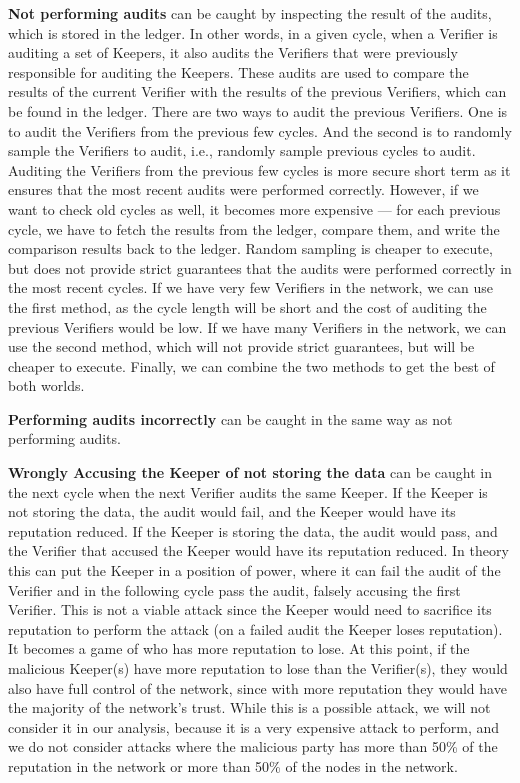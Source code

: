 \textbf{Not performing audits} can be caught by inspecting the result of the audits,
which is stored in the ledger.
In other words, in a given cycle, when a Verifier is auditing a set of Keepers,
it also audits the Verifiers that were previously responsible for auditing the Keepers.
These audits are used to compare the results of the current Verifier
with the results of the previous Verifiers, which can be found in the ledger.
There are two ways to audit the previous Verifiers.
One is to audit the Verifiers from the previous few cycles.
And the second is to randomly sample the Verifiers to audit,
i.e., randomly sample previous cycles to audit.
Auditing the Verifiers from the previous few cycles is more secure short term
as it ensures that the most recent audits were performed correctly.
However, if we want to check old cycles as well, it becomes more expensive ---
for each previous cycle, we have to fetch the results from the ledger, compare them,
and write the comparison results back to the ledger.
Random sampling is cheaper to execute, but does not provide strict guarantees
that the audits were performed correctly in the most recent cycles.
If we have very few Verifiers in the network, we can use the first method,
as the cycle length will be short and the cost of auditing the previous Verifiers would be low.
If we have many Verifiers in the network, we can use the second method,
which will not provide strict guarantees, but will be cheaper to execute.
Finally, we can combine the two methods to get the best of both worlds.

\textbf{Performing audits incorrectly} can be caught in the same way as not performing audits.

\textbf{Wrongly Accusing the Keeper of not storing the data} can be caught in the next cycle
when the next Verifier audits the same Keeper.
If the Keeper is not storing the data, the audit would fail, and the Keeper would have its reputation reduced.
If the Keeper is storing the data, the audit would pass, and the Verifier that accused the Keeper
would have its reputation reduced.
In theory this can put the Keeper in a position of power, where it can fail the audit of the Verifier
and in the following cycle pass the audit, falsely accusing the first Verifier.
This is not a viable attack since the Keeper would need to sacrifice its reputation to perform the attack
(on a failed audit the Keeper loses reputation).
It becomes a game of who has more reputation to lose.
At this point, if the malicious Keeper(s) have more reputation to lose than the Verifier(s),
they would also have full control of the network,
since with more reputation they would have the majority of the network's trust.
While this is a possible attack, we will not consider it in our analysis,
because it is a very expensive attack to perform, and we do not consider
attacks where the malicious party has more than 50\% of the reputation in the network
or more than 50\% of the nodes in the network.

